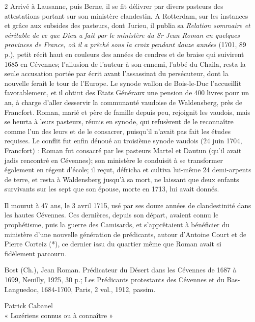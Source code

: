 {\begin{multicols}{2}
Arrivé à Lausanne, puis Berne, il se fit délivrer par divers pasteurs des attestations portant sur son ministère clandestin. A Rotterdam, sur les instances et grâce aux subsides des pasteurs, dont Jurieu, il publia sa \textit{Relation sommaire et véritable de ce que Dieu a fait par le ministère du Sr Jean Roman en quelques provinces de France, où il a prêché sous la croix pendant douze années} (1701, 89 p.), petit récit haut en couleurs des années de cendres et de braise qui suivirent 1685 en Cévennes; l’allusion de l’auteur à son ennemi, l’abbé du Chaila, resta la seule accusation portée par écrit avant l’assassinat du persécuteur, dont la nouvelle ferait le tour de l’Europe. Le synode wallon de Bois-le-Duc l’accueillit favorablement, et il obtint des Etats Généraux une pension de 400 livres pour un an, à charge d’aller desservir la communauté vaudoise de Waldensberg, près de Francfort. Roman, marié et père de famille depuis peu, rejoignit les vaudois, mais se heurta à leurs pasteurs, réunis en synode, qui refusèrent de le reconnaître comme l’un des leurs et de le consacrer, puisqu’il n’avait pas fait les études requises. Le conflit fut enfin dénoué au troisième synode vaudois (24 juin 1704, Francfort) : Roman fut consacré par les pasteurs Martel et Dautun (qu’il avait jadis rencontré en Cévennes); son ministère le conduisit à se transformer également en régent d’école; il reçut, défricha et cultiva lui-même 24 demi-arpents de terre, et resta à Waldensberg jusqu’à sa mort, ne laissant que deux enfants survivants sur les sept que son épouse, morte en 1713, lui avait donnés.

Il mourut à 47 ans, le 3 avril 1715, usé par ses douze années de clandestinité dans les hautes Cévennes. Ces dernières, depuis son départ, avaient connu le prophétisme, puis la guerre des Camisards, et s’apprêtaient à bénéficier du ministère d’une nouvelle génération de prédicants, autour d’Antoine Court et de Pierre Corteiz (*), ce dernier issu du quartier même que Roman avait si fidèlement parcouru.

\vspace{0.35em}

Bost (Ch.), Jean Roman. Prédicateur du Désert dans les Cévennes de 1687 à 1699, Neuilly, 1925, 30 p.; Les Prédicants protestants des Cévennes et du Bas-Languedoc, 1684-1700, Paris, 2 vol., 1912, passim.

\begin{flushright}
Patrick Cabanel\\[-0.1em]
« Lozériens connus ou à connaître »
\end{flushright}

\end{multicols}
}

